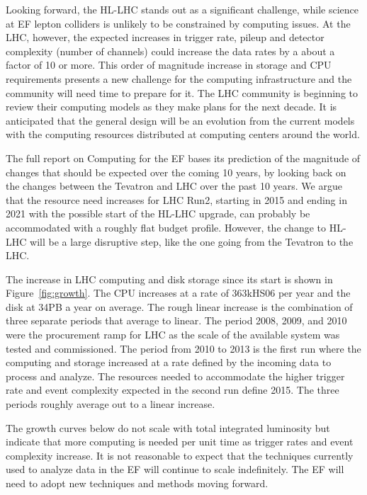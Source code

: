 Looking forward, the HL-LHC stands out as a significant challenge, while
science at EF lepton colliders is unlikely to be constrained by computing
issues.  At the LHC, however, the expected increases in trigger rate, pileup
and detector complexity (number of channels) could increase the data rates by
a about a factor of 10 or more.   This order of magnitude increase in storage
and CPU requirements presents a new challenge for the computing infrastructure
and the community will need time to prepare for it. The LHC community is
beginning to review their computing models as they make plans for the next
decade.  It is anticipated that the general design will be an evolution from
the current models with the computing resources distributed at computing
centers around the world.

The full report on Computing for the EF bases its  prediction of the magnitude
of changes that should be expected over the coming 10 years, by looking back
on  the changes between the Tevatron and LHC over the past 10 years. We argue
that  the resource need increases for LHC Run2, starting in 2015 and ending
in 2021 with the possible start of  the HL-LHC upgrade, can probably be
accommodated with a roughly flat budget profile. However, the change to HL-LHC
will be a large disruptive step, like the one going from the Tevatron to the
LHC.

The increase in LHC computing and disk storage since its start is shown in
Figure~\ref{fig:growth}.  The CPU increases at a rate of 363kHS06 per year and
the disk at 34PB a year on average.  The rough linear increase is the
combination of three separate periods that average to linear.  The period
2008, 2009, and 2010 were the procurement ramp for LHC as the scale of the
available system was tested and commissioned. The period from 2010 to 2013 is
the first run where the computing and storage increased at a rate defined by
the incoming data to process and analyze.  The resources needed to accommodate
the higher trigger rate and event complexity expected in the second run define
2015.  The three periods roughly average out to a linear increase.

The growth curves below do not scale with total integrated luminosity but
indicate that more computing is needed per unit time as trigger rates and event
complexity increase. It is not reasonable to expect that the techniques
currently used to analyze data in the EF will continue to scale indefinitely.
The EF will need to adopt new techniques and methods moving forward.

